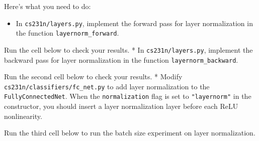 \documentclass[11pt]{article}
\providecommand{\tightlist}{%
      \setlength{\itemsep}{0pt}\setlength{\parskip}{0pt}}
\begin{document}
Here's what you need to do:

\begin{itemize}
\tightlist
\item
  In \texttt{cs231n/layers.py}, implement the forward pass for layer
  normalization in the function \texttt{layernorm\_forward}.
\end{itemize}

Run the cell below to check your results. * In
\texttt{cs231n/layers.py}, implement the backward pass for layer
normalization in the function \texttt{layernorm\_backward}.

Run the second cell below to check your results. * Modify
\texttt{cs231n/classifiers/fc\_net.py} to add layer normalization to the
\texttt{FullyConnectedNet}. When the \texttt{normalization} flag is set
to \texttt{"layernorm"} in the constructor, you should insert a layer
normalization layer before each ReLU nonlinearity.

Run the third cell below to run the batch size experiment on layer
normalization.
\end{document}
